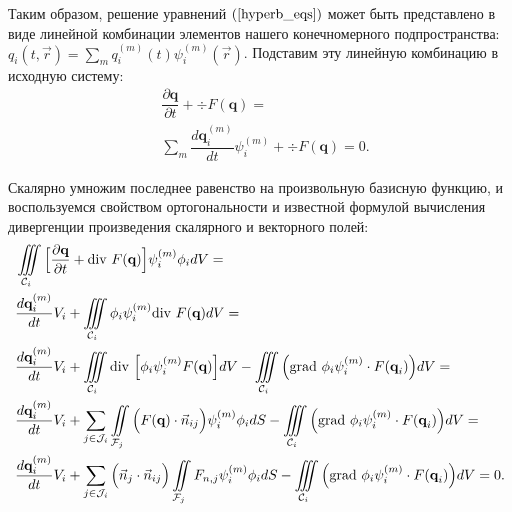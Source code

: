 \documentclass[14pt, a4paper, fleqn]{extreport}
\begin{document}
	Таким образом, решение уравнений $(\ref{hyperb_eqs})$ может быть представлено в 
	виде линейной комбинации элементов нашего конечномерного 
	подпространства: $q_i(t, \vec{r}) = \sum\limits_m q_i^{(m)}(t)\psi_i^{(m)}(\vec{r})$.
	Подставим эту линейную комбинацию в исходную систему:
	\begin{equation*}
	\begin{split}
		&\dfrac{\partial \textbf{q}}{\partial t} + \div{F(\textbf{q})} = 
		\\
		&\sum\limits_m\dfrac{d \textbf{q}_i^{(m)}}{d t}\psi_i^{(m)} + \div{F(\textbf{q})} = 0.
	\end{split}
	\end{equation*}
	
	Скалярно умножим последнее равенство на произвольную базисную функцию,
	и воспользуемся свойством ортогональности и известной формулой вычисления 
	дивергенции произведения скалярного и векторного полей:
	\begin{equation}
	\label{hyperb_eqs_int_dg}
	\begin{split}
		&\iiint\limits_{\mathcal{C}_i} \Big[
			\dfrac{\partial \textbf{q}}{\partial t} + \text{div }{F(\textbf{q})} \Big]\psi_i^{(m)} \phi_i dV = 
		\\
		&\dfrac{d \textbf{q}_i^{(m)}}{d t}V_i 
			+ \iiint\limits_{\mathcal{C}_i} \phi_i \psi_i^{(m)} \text{div }{F(\textbf{q})} dV =
		\\
		&\dfrac{d \textbf{q}_i^{(m)}}{d t}V_i 
			+ \iiint\limits_{\mathcal{C}_i} \text{div }{\Big[ \phi_i \psi_i^{(m)} F(\textbf{q}) \Big]} dV
			- \iiint\limits_{\mathcal{C}_i} \Big( \text{grad }{\phi_i \psi_i^{(m)}} \cdot F(\textbf{q}_i) \Big) dV = 
		\\
		&\dfrac{d \textbf{q}_i^{(m)}}{d t}V_i 
			+ \sum\limits_{j \in \mathcal{J}_i}\iint\limits_{\mathcal{F}_j} 
				\Big( F(\textbf{q}) \cdot \vec{n}_{ij} \Big) \psi_i^{(m)} \phi_i dS
			- \iiint\limits_{\mathcal{C}_i} \Big( \text{grad }{\phi_i \psi_i^{(m)}} \cdot F(\textbf{q}_i) \Big) dV = 
		\\
		&\dfrac{d \textbf{q}_i^{(m)}}{d t}V_i 
			+ \sum\limits_{j \in \mathcal{J}_i} 
				\Big( \vec{n}_{j} \cdot \vec{n}_{ij} \Big) \iint\limits_{\mathcal{F}_j} F_{n,j} \psi_i^{(m)} \phi_i dS
			- \iiint\limits_{\mathcal{C}_i} \Big( \text{grad }{\phi_i \psi_i^{(m)}} \cdot F(\textbf{q}_i) \Big) dV 
			= 0. 
	\end{split}
	\end{equation}
	
\end{document}
